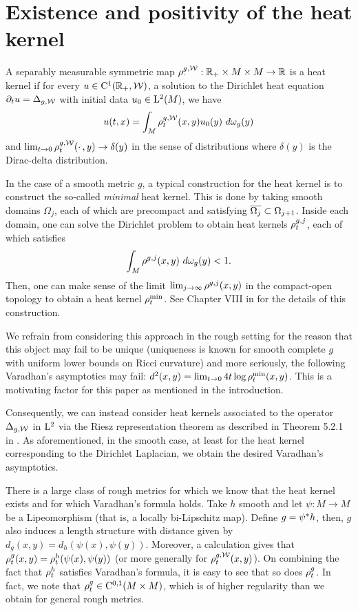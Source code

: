 \documentclass[a4paper, 12pt]{amsart}
\begin{document}
\section{Existence and positivity of the heat kernel}

\begin{defn}
A separably measurable symmetric map $\rho^{g,\mathcal{W}}_{\cdotp}: \mathbb{R}_+ \times M \times M \to \mathbb{R}$ is a heat kernel if for every $u \in {\rm C}^{1}_{\rm {}}(\mathbb{R}_+, \mathcal{W})$, a solution to the Dirichlet heat equation $\partial_t u = \Delta_{g,\mathcal{W}}$ with initial data $u_0 \in {\rm L}^{2}_{\rm {}}(M)$, we have
\[
u(t,x) = \int_{M} \rho^{g,\mathcal{W}}_t(x,y) u_0(y)\ d\omega_g(y)
\]
and
$\lim_{t \to 0} \rho_t^{g,\mathcal{W}}(\cdotp,y) \to \delta(y)$ in the sense of distributions where $\delta(y)$ is the Dirac-delta distribution.
\end{defn}

In the case of a smooth metric $g$, a typical construction for
the heat kernel is to construct the so-called \emph{minimal} heat kernel.
This is done by taking smooth domains $\Omega_j$, 
each of which are precompact and satisfying $\overline{\Omega_j} \subset \Omega_{j+1}$. 
Inside each domain, one can solve the Dirichlet problem
to obtain heat kernels $\rho^{g,j}_{t}$, each of which
satisfies 
$$ \int_{M} \hk^{g,j}(x,y)\ d\omega_g(y) < 1.$$
Then, one can make sense of the limit $\lim_{j \to \infty} \rho^{g,j}(x,y)$
in the compact-open topology to obtain a heat kernel $\rho^{\min}_t$.
See Chapter VIII in \cite{Chavel} for the details
of this construction.

We refrain from considering this approach in the rough setting 
for the reason that this object may fail to be unique (uniqueness
is known for smooth complete $g$ with 
uniform lower bounds on Ricci curvature) and more seriously, the following
Varadhan's asymptotics may fail: 
$d^2(x,y) = \lim_{t \to 0} 4t \log \rho^{\min}_t(x,y)$.
This is a motivating factor for this paper as mentioned in the 
introduction.

Consequently, we can instead consider heat kernels
associated to the operator $\Delta_{g,\mathcal{W}}$ in ${\rm L}^{2}_{\rm {}}$
via the Riesz representation theorem as described in Theorem 
5.2.1 in \cite{Davies}. As aforementioned, in the smooth case,
at least for the heat kernel corresponding to the 
Dirichlet Laplacian, we obtain the desired  Varadhan's
asymptotics.  

There is a large class of rough metrics
for which we know that the heat kernel exists
and for which Varadhan's formula holds. 
Take $h$ smooth and let $\psi:M \to M$
be a Lipeomorphism (that is, a locally bi-Lipschitz map).
Define $g = {\psi}^\ast h$, then, $g$ 
also induces a length structure with 
distance given by $d_g(x,y) = d_h(\psi(x), \psi(y))$.
Moreover, a calculation gives
that $\rho^{g}_t(x,y) = \rho^{h}_t(\psi(x), \psi(y))$
(or more generally for $\rho^{g,\mathcal{W}}_t(x,y)$). 
On combining the fact that $\rho^h_t$ satisfies
Varadhan's formula, it is easy to see that
so does $\rho^{g}_t$. In fact, we 
note that $\rho^g_t \in {\rm C}^{0,1}_{\rm {}}(M \times M)$,
which is of higher regularity than we
obtain for general rough metrics.
\end{document}
